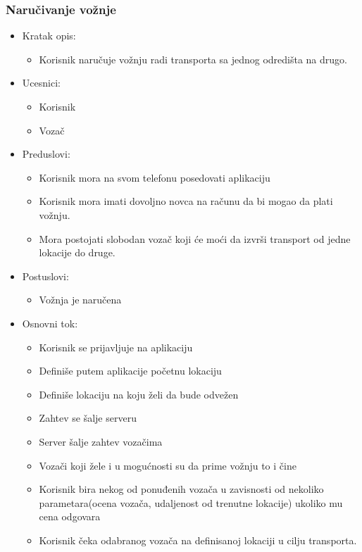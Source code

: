 \subsubsection{\bfseries Naru\v civanje vo\v znje}
\begin{itemize}
	\item Kratak opis:
		\begin{itemize}
			\item Korisnik naručuje vožnju radi transporta sa jednog odredišta na drugo.
		\end{itemize}
 
	\item Ucesnici:
		\begin{itemize}
			\item Korisnik
		    \item Vozač
		\end{itemize}				

	\item Preduslovi:
		\begin{itemize}
		    \item Korisnik mora na svom telefonu posedovati aplikaciju
		    \item Korisnik mora imati dovoljno novca na računu da bi mogao da plati vožnju.
		    \item Mora postojati slobodan vozač koji će moći da izvrši transport od jedne lokacije do druge.
		\end{itemize}

	\item Postuslovi:
		\begin{itemize}
			\item Vožnja je naručena
		\end{itemize}		


	\item Osnovni tok:
		\begin{itemize}
		    \item Korisnik se prijavljuje na aplikaciju
		    \item Definiše putem  aplikacije  početnu lokaciju
		    \item Definiše lokaciju na koju želi da bude odvežen
		    \item Zahtev se šalje serveru
		    \item Server šalje zahtev vozačima
		    \item Vozači koji žele i u mogućnosti su da prime vožnju to i čine
		    \item Korisnik bira  nekog od ponuđenih vozača u zavisnosti od nekoliko parametara(ocena vozača, udaljenost od trenutne lokacije) ukoliko mu cena odgovara
		    \item Korisnik čeka odabranog vozača na definisanoj lokaciji u cilju transporta. 
		\end{itemize}


\end{itemize}
